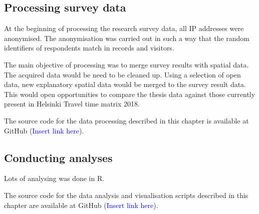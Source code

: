 \subsection{Processing survey data}
\justify
At the beginning of processing the research survey data, all IP addresses were anonymised. The anonymisation was carried out in such a way that the random identifiers of respondents match in records and visitors.

The main objective of processing was to merge survey results with spatial data. The acquired data would be need to be cleaned up. Using a selection of open data, new explanatory spatial data would be merged to the survey result data. This would open opportunities to compare the thesis data against those currently present in Helsinki Travel time matrix 2018.

The source code for the data processing described in this chapter is available at GitHub (\textcolor{blue}{Insert link here}).

\subsection{Conducting analyses}
\justify
Lots of analysing was done in R. 

The source code for the data analysis and visualisation scripts described in this chapter are available at GitHub (\textcolor{blue}{Insert link here}).